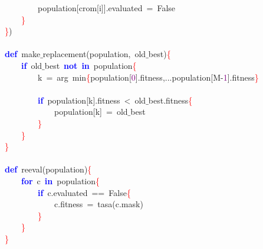 \mbox{}\ \ \ \ \ \ \ \ population\textcolor{BrickRed}{[}crom\textcolor{BrickRed}{[}i\textcolor{BrickRed}{]].}evaluated\ \textcolor{BrickRed}{=}\ False \\
\mbox{}\ \ \ \ \textcolor{Red}{\}} \\
\mbox{}\textcolor{Red}{\}}\textcolor{BrickRed}{)} \\
\mbox{} \\
\mbox{}\textbf{\textcolor{Blue}{def}}\ make$\_$replacement\textcolor{BrickRed}{(}population\textcolor{BrickRed}{,}\ old$\_$best\textcolor{BrickRed}{)}\textcolor{Red}{\{} \\
\mbox{}\ \ \ \ \textbf{\textcolor{Blue}{if}}\ old$\_$best\ \textbf{\textcolor{Blue}{not}}\ \textbf{\textcolor{Blue}{in}}\ population\textcolor{Red}{\{} \\
\mbox{}\ \ \ \ \ \ \ \ k\ \textcolor{BrickRed}{=}\ arg\ min\textcolor{Red}{\{}population\textcolor{BrickRed}{[}\textcolor{Purple}{0}\textcolor{BrickRed}{].}fitness\textcolor{BrickRed}{,...}population\textcolor{BrickRed}{[}M\textcolor{BrickRed}{-}\textcolor{Purple}{1}\textcolor{BrickRed}{].}fitness\textcolor{Red}{\}} \\
\mbox{} \\
\mbox{}\ \ \ \ \ \ \ \ \textbf{\textcolor{Blue}{if}}\ population\textcolor{BrickRed}{[}k\textcolor{BrickRed}{].}fitness\ \textcolor{BrickRed}{\textless{}}\ old$\_$best\textcolor{BrickRed}{.}fitness\textcolor{Red}{\{} \\
\mbox{}\ \ \ \ \ \ \ \ \ \ \ \ population\textcolor{BrickRed}{[}k\textcolor{BrickRed}{]}\ \textcolor{BrickRed}{=}\ old$\_$best \\
\mbox{}\ \ \ \ \ \ \ \ \textcolor{Red}{\}} \\
\mbox{}\ \ \ \ \textcolor{Red}{\}} \\
\mbox{}\textcolor{Red}{\}} \\
\mbox{} \\
\mbox{}\textbf{\textcolor{Blue}{def}}\ reeval\textcolor{BrickRed}{(}population\textcolor{BrickRed}{)}\textcolor{Red}{\{} \\
\mbox{}\ \ \ \ \textbf{\textcolor{Blue}{for}}\ c\ \textbf{\textcolor{Blue}{in}}\ population\textcolor{Red}{\{} \\
\mbox{}\ \ \ \ \ \ \ \ \textbf{\textcolor{Blue}{if}}\ c\textcolor{BrickRed}{.}evaluated\ \textcolor{BrickRed}{==}\ False\textcolor{Red}{\{} \\
\mbox{}\ \ \ \ \ \ \ \ \ \ \ \ c\textcolor{BrickRed}{.}fitness\ \textcolor{BrickRed}{=}\ tasa\textcolor{BrickRed}{(}c\textcolor{BrickRed}{.}mask\textcolor{BrickRed}{)} \\
\mbox{}\ \ \ \ \ \ \ \ \textcolor{Red}{\}} \\
\mbox{}\ \ \ \ \textcolor{Red}{\}} \\
\mbox{}\textcolor{Red}{\}} \\
\mbox{}
